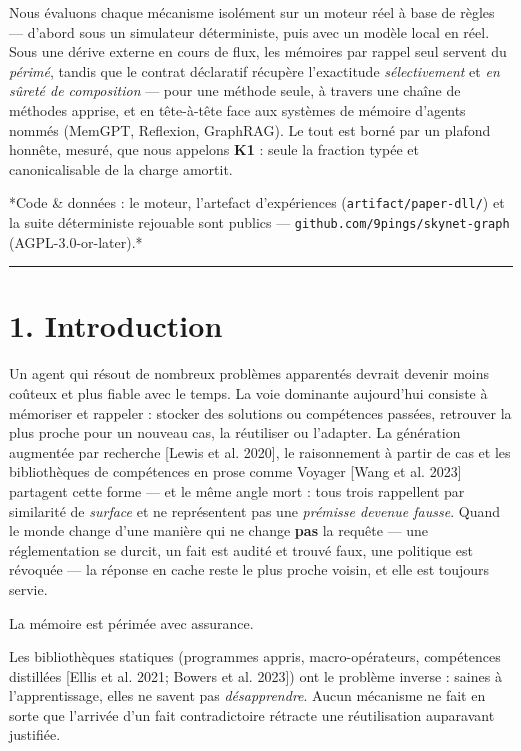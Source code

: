 \documentclass[11pt]{article}
\begin{document}
Nous évaluons chaque mécanisme isolément sur un moteur réel à base de règles — d'abord sous un simulateur déterministe, puis avec un modèle local en réel. Sous une dérive externe en cours de flux, les mémoires par rappel seul servent du \emph{périmé}, tandis que le contrat déclaratif récupère l'exactitude \emph{sélectivement} et \emph{en sûreté de composition} — pour une méthode seule, à travers une chaîne de méthodes apprise, et en tête-à-tête face aux systèmes de mémoire d'agents nommés (MemGPT, Reflexion, GraphRAG). Le tout est borné par un plafond honnête, mesuré, que nous appelons \textbf{K1} : seule la fraction typée et canonicalisable de la charge amortit.

*Code \& données : le moteur, l'artefact d'expériences (\texttt{artifact/\allowbreak{}paper-dll/\allowbreak{}}) et la suite déterministe rejouable sont publics — \texttt{github.com/\allowbreak{}9pings/\allowbreak{}skynet-graph} (AGPL-3.0-or-later).*

\medskip\hrule\medskip

\section*{1. Introduction}

Un agent qui résout de nombreux problèmes apparentés devrait devenir moins coûteux et plus fiable avec le temps. La voie dominante aujourd'hui consiste à mémoriser et rappeler : stocker des solutions ou compétences passées, retrouver la plus proche pour un nouveau cas, la réutiliser ou l'adapter. La génération augmentée par recherche [Lewis et al. 2020], le raisonnement à partir de cas et les bibliothèques de compétences en prose comme Voyager [Wang et al. 2023] partagent cette forme — et le même angle mort : tous trois rappellent par similarité de \emph{surface} et ne représentent pas une \emph{prémisse devenue fausse}. Quand le monde change d'une manière qui ne change \textbf{pas} la requête — une réglementation se durcit, un fait est audité et trouvé faux, une politique est révoquée — la réponse en cache reste le plus proche voisin, et elle est toujours servie.

La mémoire est périmée avec assurance.

Les bibliothèques statiques (programmes appris, macro-opérateurs, compétences distillées [Ellis et al. 2021; Bowers et al. 2023]) ont le problème inverse : saines à l'apprentissage, elles ne savent pas \emph{désapprendre}. Aucun mécanisme ne fait en sorte que l'arrivée d'un fait contradictoire rétracte une réutilisation auparavant justifiée.
\end{document}
